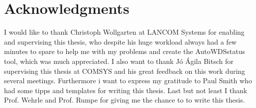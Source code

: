 \cleardoublepage

\chapter*{Acknowledgments}

I would like to thank Christoph Wollgarten at LANCOM Systems for enabling and supervising this thesis, who despite his huge workload always had a few minutes to spare
to help me with my problems and create the AutoWDSstatus tool, which was much appreciated.
I also want to thank J\'o \'Agila Bitsch for supervising this thesis at COMSYS and his great feedback on this work during several meetings.
Furthermore i want to express my gratitude to Paul Smith who had some tipps and templates for writing this thesis.
Last but not least I thank Prof. Wehrle and Prof. Rumpe for giving me the chance to to write this thesis.